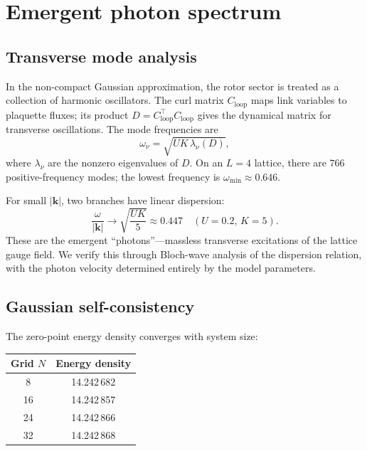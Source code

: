 \documentclass[aps,prb,twocolumn,superscriptaddress,showpacs]{revtex4-2}
\begin{document}
\section{Emergent photon spectrum}
\label{sec:photon}

\subsection{Transverse mode analysis}

In the non-compact Gaussian approximation, the rotor sector is treated as
a collection of harmonic oscillators. The curl matrix $C_{\mathrm{loop}}$
maps link variables to plaquette fluxes; its product
$D=C_{\mathrm{loop}}^\top C_{\mathrm{loop}}$ gives the dynamical matrix
for transverse oscillations. The mode frequencies are
\begin{equation}
\omega_\nu = \sqrt{UK\,\lambda_\nu(D)},
\end{equation}
where $\lambda_\nu$ are the nonzero eigenvalues of $D$. On an $L=4$
lattice, there are $766$ positive-frequency modes; the lowest frequency is
$\omega_{\min}\approx 0.646$.

For small $|\mathbf{k}|$, two branches have linear dispersion:
\begin{equation}
\frac{\omega}{|\mathbf{k}|} \to \sqrt{\frac{UK}{5}}
\approx 0.447\quad(U=0.2,\,K=5).
\end{equation}
These are the emergent ``photons''---massless transverse excitations of the
lattice gauge field. We verify this through Bloch-wave analysis of the
dispersion relation, with the photon velocity determined entirely by the
model parameters.

\subsection{Gaussian self-consistency}

The zero-point energy density converges with system size:

\begin{center}
\begin{tabular}{cc}
\toprule
Grid $N$ & Energy density \\
\midrule
8  & 14.242\,682 \\
16 & 14.242\,857 \\
24 & 14.242\,866 \\
32 & 14.242\,868 \\
\bottomrule
\end{tabular}
\end{center}
\end{document}
